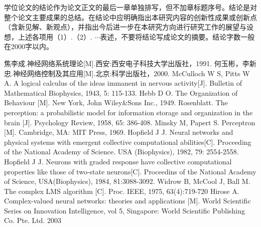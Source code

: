 \documentclass{yangthesis}
\begin{document}
学位论文的结论作为论文正文的最后一章单独排写，但不加章标题序号。结论是对整个论文主要成果的总结。在结论中应明确指出本研究内容的创新性成果或创新点（含新见解、新观点），并指出今后进一步在本研究方向进行研究工作的展望与设想，上述各项用（1）.（2）.  $\cdots$表述，不要将结论写成论文的摘要。结论字数一般在2000字以内。

\begin{thebibliography}{99}


 焦李成.神经网络系统理论[M].西安:西安电子科技大学出版社，1991.
 何玉彬，李新忠.神经网络控制及其应用[M].北京:科学出版社，2000.
 McCulloch W S, Pitts W A. A logical calculus of the ideas immanent in nervous activity[J]. Bulletin of Mathematical Biophysics, 1943, 5: 115-133.
 Hebb D O. The Organization of Behaviour [M]. New York, John Wiley\&Sons Inc., 1949.
 Rosenblatt. The perception: a probabilistic model for information storage and organization in the brain [J]. Psychology Review, 1958, 65: 386-408.
 Minsky M, Papert S. Perceptron [M]. Cambridge, MA: MIT Press, 1969.
 Hopf\/ield  J  J.  Neural  networks  and  physical  systems  with  emergent  collective computational  abilities[C].  Proceeding  of the National Academy  of  Science.  USA (Biophysics), 1982, 79: 2554-2558.
 Hopf\/ield J J. Neurons with graded response have collective computational properties like those  of  two-state  neurons[C].  Proceedins  of  the  National  Academy  of  Science, USA(Biophysics), 1984, 81:3088-3092.
 Widrow B, McCool J, Ball M. The complex LMS algorithm [C]. Proc. IEEE, 1975, 63(4):719-720
 Hirose  A.  Complex-valued  neural  networks:  theories  and  applications  [M].  World Scientif\/ic Series on Innovation Intelligence, vol 5, Singapore: World Scientif\/ic Publishing Co. Pte. Ltd. 2003


\end{thebibliography}
\end{document}
